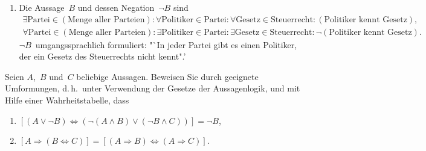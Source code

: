 \documentclass[a4paper]{article}
\begin{document}
\begin{solution}\leavevmode
    \begin{enumerate}
        \begin{enumerate}
            \item[$A_1$] \emph{Aus~$A$ folgt nicht~$A_1$.} $A$~macht nur eine Aussage über den Fall, dass die Sonne scheint. Wir können auch aus einem anderen Grund baden gehen, z.\,B.\ wenn ein Freund Geburtstag hat. Dann muss aber nicht notwendigerweise die Sonne scheinen. \emph{Die Konversion (Umkehrung) gilt nicht immer.}
            \item[$A_2$] \emph{Aus~$A$ folgt nicht~$A_2$.} $A$~macht nur eine Aussage über den Fall, dass die Sonne scheint. Scheint die Sonne nicht, könnte alles passieren~-- wir könnten trotzdem baden gehen. \emph{Eine Implikation ist eine Äquivalenz.}
            \item[$A_3$] \emph{Aus~$A$ folgt~$A_3$.} Würde nämlich die Sonne scheinen, so gehen wir nach~$A$ baden, was aber der Voraussetzung widerspricht. \emph{Implikation und Kontraposition sind (tautologisch) äquivalent.}
        \end{enumerate}
        \item Die Aussage~$B$ und dessen Negation~$\neg B$ sind
              \begin{gather*}
                  \exists\text{Partei}\in(\text{Menge aller Parteien})\colon \forall\text{Politiker}\in\text{Partei}\colon \forall\text{Gesetz}\in\text{Steuerrecht}\colon (\text{Politiker kennt Gesetz}), \\
                  \forall\text{Partei}\in(\text{Menge aller Parteien})\colon \exists\text{Politiker}\in\text{Partei}\colon \exists\text{Gesetz}\in\text{Steuerrecht}\colon \neg(\text{Politiker kennt Gesetz}).
              \end{gather*}
              $\neg B$~umgangssprachlich formuliert: "`In jeder Partei gibt es einen Politiker, der ein Gesetz des Steuerrechts nicht kennt".'
    \end{enumerate}
\end{solution}

\begin{problem}[B01.A2]
Seien $A$,~$B$ und~$C$ beliebige Aussagen. Beweisen Sie durch geeignete Umformungen, d.\,h.\ unter Verwendung der Gesetze der Aussagenlogik, und mit Hilfe einer Wahrheitstabelle, dass
\begin{enumerate}
    \item $[(A \vee \neg B) \Leftrightarrow (\neg(A \wedge B) \vee (\neg B \wedge C))] = \neg B$,
    \item $[A \Rightarrow (B \Leftrightarrow C)] = [(A \Rightarrow B) \Leftrightarrow (A \Rightarrow C)]$.
\end{enumerate}
\end{problem}
\end{document}
